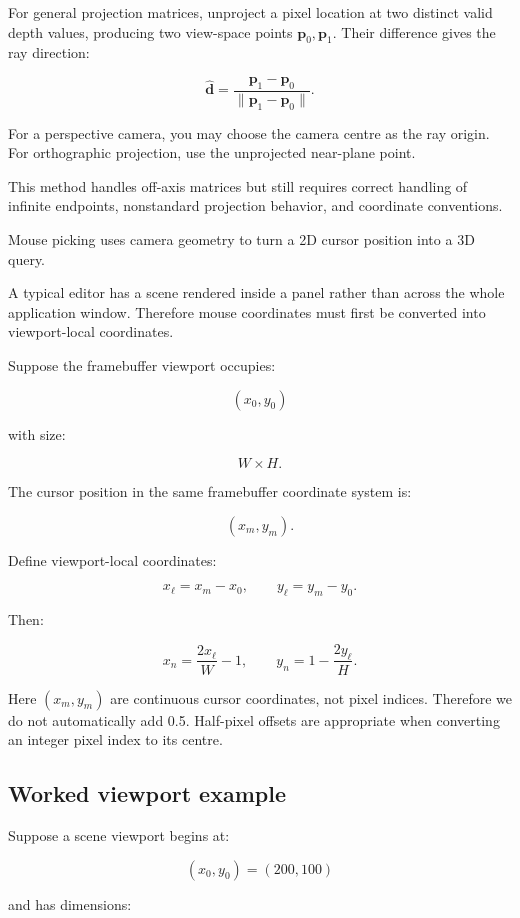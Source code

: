 For general projection matrices, unproject a pixel location at two distinct valid depth values, producing two view-space points \(\mathbf p_0,\mathbf p_1\). Their difference gives the ray direction:

\[ \boxed{ \hat{\mathbf d}= \frac{\mathbf p_1-\mathbf p_0} {\|\mathbf p_1-\mathbf p_0\|}. } \]

For a perspective camera, you may choose the camera centre as the ray origin. For orthographic projection, use the unprojected near-plane point.

This method handles off-axis matrices but still requires correct handling of infinite endpoints, nonstandard projection behavior, and coordinate conventions.

Mouse picking uses camera geometry to turn a 2D cursor position into a 3D query.

A typical editor has a scene rendered inside a panel rather than across the whole application window. Therefore mouse coordinates must first be converted into viewport-local coordinates.

Suppose the framebuffer viewport occupies:

\[ (x_0,y_0) \]

with size:

\[ W\times H. \]

The cursor position in the same framebuffer coordinate system is:

\[ (x_m,y_m). \]

Define viewport-local coordinates:

\[ \boxed{ x_\ell=x_m-x_0, \qquad y_\ell=y_m-y_0. } \]

Then:

\[ \boxed{ x_n=\frac{2x_\ell}{W}-1, \qquad y_n=1-\frac{2y_\ell}{H}. } \]

Here \((x_m,y_m)\) are continuous cursor coordinates, not pixel indices. Therefore we do not automatically add 0.5. Half-pixel offsets are appropriate when converting an integer pixel index to its centre.

\subsection{Worked viewport example}\label{02-foundations-ii-ch035-worked-viewport-example}

Suppose a scene viewport begins at:

\[ (x_0,y_0)=(200,100) \]

and has dimensions:

